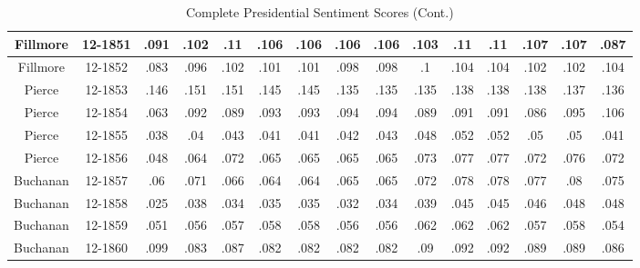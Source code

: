\begin{sidewaystable}
\begin{singlespace}
\begin{center}
\begin{tabular}{||c c c c c c c c c c c c c c c||}
\hline
Fillmore & 12-1851 & .091 & .102 & .11 & .106 & .106 & .106 & .106 & .103 & .11 & .11 & .107 & .107 & .087 \\ 
\hline
Fillmore & 12-1852 & .083 & .096 & .102 & .101 & .101 & .098 & .098 & .1 & .104 & .104 & .102 & .102 & .104 \\ 
\hline
Pierce & 12-1853 & .146 & .151 & .151 & .145 & .145 & .135 & .135 & .135 & .138 & .138 & .138 & .137 & .136 \\ 
\hline
Pierce & 12-1854 & .063 & .092 & .089 & .093 & .093 & .094 & .094 & .089 & .091 & .091 & .086 & .095 & .106 \\ 
\hline
Pierce & 12-1855 & .038 & .04 & .043 & .041 & .041 & .042 & .043 & .048 & .052 & .052 & .05 & .05 & .041 \\ 
\hline
Pierce & 12-1856 & .048 & .064 & .072 & .065 & .065 & .065 & .065 & .073 & .077 & .077 & .072 & .076 & .072 \\ 
\hline
Buchanan & 12-1857 & .06 & .071 & .066 & .064 & .064 & .065 & .065 & .072 & .078 & .078 & .077 & .08 & .075 \\ 
\hline
Buchanan & 12-1858 & .025 & .038 & .034 & .035 & .035 & .032 & .034 & .039 & .045 & .045 & .046 & .048 & .048 \\ 
\hline
Buchanan & 12-1859 & .051 & .056 & .057 & .058 & .058 & .056 & .056 & .062 & .062 & .062 & .057 & .058 & .054 \\ 
\hline
Buchanan & 12-1860 & .099 & .083 & .087 & .082 & .082 & .082 & .082 & .09 & .092 & .092 & .089 & .089 & .086 \\ 
\hline
 \hline
 \end{tabular}
\end{center}
\caption{Complete Presidential Sentiment Scores (Cont.)}
\label{appendix:sent3}
\end{singlespace}
\end{sidewaystable}

